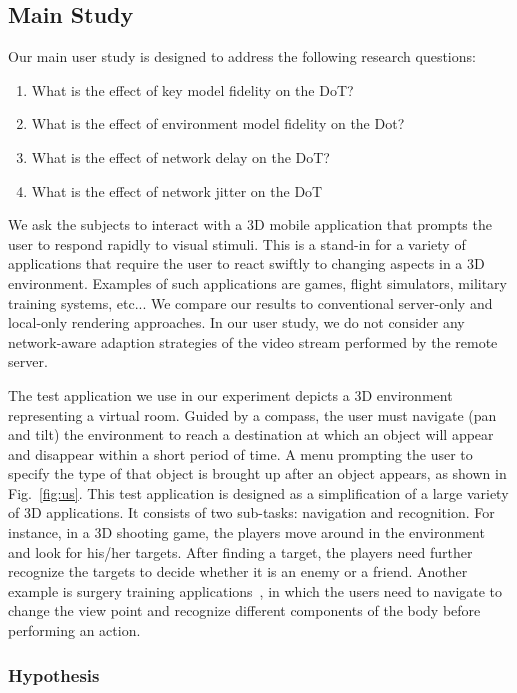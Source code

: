 \subsection{Main Study}
\label{sec:ms}

Our main user study is designed to address the following research questions:
\begin{enumerate}
\item
What is the effect of key model fidelity on the DoT?
\item
What is the effect of environment model fidelity on the Dot?
\item
What is the effect of network delay on the DoT?
\item
What is the effect of network jitter on the DoT
\end{enumerate}

We ask the subjects to interact with a 3D mobile application that prompts the user to respond rapidly to visual stimuli. This is a stand-in for a variety of applications that require the user to react swiftly to changing aspects in a 3D environment. Examples of such applications are games, flight simulators, military training systems, etc... We compare our results to conventional server-only and local-only rendering approaches. In our user study, we do not consider any network-aware adaption strategies of the video stream performed by the remote server.

The test application we use in our experiment depicts a 3D environment representing a virtual room. Guided by a compass, the user must navigate (pan and tilt) the environment to reach a destination at which an object will appear and disappear within a short period of time.
A menu prompting the user to specify the type of that object is brought up after an object appears, as shown in Fig.~\ref{fig:us}.
This test application is designed as a simplification of a large variety of 3D applications. It consists of two sub-tasks: navigation and recognition.
For instance, in a 3D shooting game, the players move around in the environment and look for his/her targets. After finding a target, the players need further recognize the targets to decide whether it is an enemy or a friend.
Another example is surgery training applications~\cite{cecil2013}, in which the users need to navigate to change the view point and recognize different components of the body before performing an action.

\subsubsection{Hypothesis}

